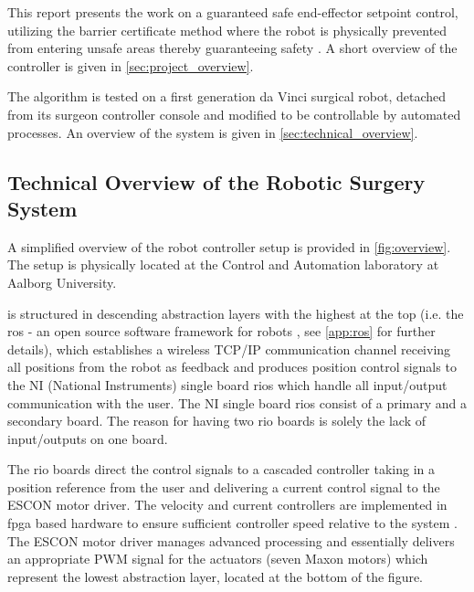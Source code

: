 This report presents the work on a guaranteed safe end-effector setpoint control, %
utilizing the barrier certificate method where the robot is physically prevented from entering unsafe areas thereby guaranteeing safety \citep{bib:safety}. A short overview of the controller is given in \autoref{sec:project_overview}.

The algorithm is tested on a first generation da Vinci surgical robot, detached from its surgeon controller console and modified to be controllable by automated processes. An overview of the system is given in \autoref{sec:technical_overview}.





\subsection{Technical Overview of the Robotic Surgery System}\label{sec:technical_overview}
A simplified overview of the robot controller setup is provided in \autoref{fig:overview}. The setup is physically located at the Control and Automation laboratory at Aalborg University. 

 is structured in descending abstraction layers with the highest at the top (i.e. the \gls{ros} - an open source software framework for robots \citep{bib:ros}, see \autoref{app:ros} for further details), which establishes a wireless TCP/IP communication channel receiving all positions from the robot as feedback and produces position control signals to the NI (National Instruments) single board \glspl{rio} which handle all input/output communication with the user. The NI single board \glspl{rio} consist of a primary and a secondary board. The reason for having two \gls{rio} boards is solely the lack of input/outputs on one board.

The \gls{rio} boards direct the control signals to a cascaded controller taking in a position reference from the user and delivering a current control signal to the ESCON motor driver. The velocity and current controllers are implemented in \gls{fpga} based hardware to ensure sufficient controller speed relative to the system \citep{bib:robot_paper}. The ESCON motor driver manages advanced processing and essentially delivers an appropriate PWM signal for the actuators (seven Maxon motors) which represent the lowest abstraction layer, located at the bottom of the figure.

